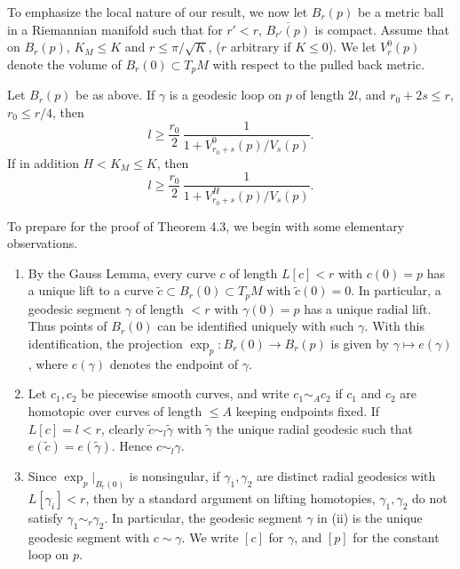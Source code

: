 To emphasize the local nature of our result, we now let $B_r(p)$ be a metric
ball in a Riemannian manifold such that for $r' < r$, $\overline{B_{r'}(p)}$ is
compact. Assume that on $B_r(p)$, $K_M \le K$ and $r \le \pi/\sqrt{K}$, ($r$
arbitrary if $K \le 0$). We let $V_r^0(p)$ denote the volume of $B_r(0) \subset
T_pM$ with respect to the pulled back metric.

\begin{theorem}
\label{thm:local-injectivity-radius-bound}
Let $B_r(p)$ be as above. If $\gamma$ is a geodesic loop on $p$ of length
$2l$, and $r_0+2s \le r$, $r_0 \le r/4$, then
\begin{equation}\tag{4.21}
l \ge \frac{r_0}{2}\,\frac{1}{1+V^0_{r_0+s}(p)/V_s(p)}.
\end{equation}
If in addition $H < K_M \le K$, then
\begin{equation}\tag{4.22}
l \ge \frac{r_0}{2}\,\frac{1}{1+V^H_{r_0+s}(p)/V_s(p)}.
\end{equation}
\end{theorem}

To prepare for the proof of Theorem 4.3, we begin with some elementary
observations.

\begin{enumerate}
\item[(i)] By the Gauss Lemma, every curve $c$ of length $L[c] < r$ with
$c(0)=p$ has a unique lift to a curve $\tilde c \subset B_r(0) \subset T_pM$ with
$\tilde c(0)=0$. In particular, a geodesic segment $\gamma$ of length $< r$ with
$\gamma(0)=p$ has a unique radial lift. Thus points of $B_r(0)$ can be
identified uniquely with such $\gamma$. With this identification, the projection
$\exp_p : B_r(0) \to B_r(p)$ is given by $\gamma \mapsto e(\gamma)$, where
$e(\gamma)$ denotes the endpoint of $\gamma$.

\item[(ii)] Let $c_1,c_2$ be piecewise smooth curves, and write $c_1 \sim_A c_2$
if $c_1$ and $c_2$ are homotopic over curves of length $\le A$ keeping endpoints
fixed. If $L[c]=l<r$, clearly $\tilde c \sim_l \tilde\gamma$ with $\tilde\gamma$
the unique radial geodesic such that $e(\tilde c)=e(\tilde\gamma)$. Hence
$c \sim_l \gamma$.

\item[(iii)] Since $\exp_p \vert_{B_r(0)}$ is nonsingular, if $\gamma_1,\gamma_2$
are distinct radial geodesics with $L[\gamma_i]<r$, then by a standard argument
on lifting homotopies, $\gamma_1,\gamma_2$ do not satisfy $\gamma_1 \sim_r
\gamma_2$. In particular, the geodesic segment $\gamma$ in (ii) is the unique
geodesic segment with $c \sim \gamma$. We write $[c]$ for $\gamma$, and
$[p]$ for the constant loop on $p$.
\end{enumerate}

